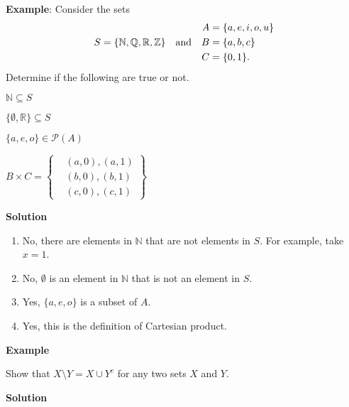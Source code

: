 \documentclass{article}
\begin{document}
    \textbf{Example}: Consider the sets $$S = \{\mathbb{N}, \mathbb{Q}, \mathbb{R}, \mathbb{Z}\}
    \text{\quad and\quad}
    \begin{aligned}
        A &= \{a, e, i, o, u\} \\
        B &= \{a, b, c\} \\
        C &= \{0, 1\}.
    \end{aligned}$$
    Determine if the following are true or not.
    \begin{enumerate}
    \begin{multicols}{2}
        \item $\mathbb{N} \subseteq S$
        \item $\{\emptyset, \mathbb{R}\} \subseteq S$
        \item $\{a, e, o\} \in \mathcal{P}(A)$
        \item 
        $B \times C = 
        \left\{\begin{aligned}
            & (a, 0), (a, 1) \\
            & (b, 0), (b, 1) \\
            & (c, 0), (c, 1)
        \end{aligned}\right\}$
                
    \end{multicols}
    \end{enumerate}
    
    \vspace{1.5mm}
    \textbf{Solution}
    \begin{enumerate}
        \item No, there are elements in $\mathbb{N}$ that are not elements in $S$. For example, take $x = 1$.
        \item No, $\emptyset$ is an element in $\mathbb{N}$ that is not an element in $S$.
        \item Yes, $\{a, e, o\}$ is a subset of $A$.
        \item Yes, this is the definition of Cartesian product.
    \end{enumerate}

    \vspace{1.5mm}
    \textbf{Example}
    
    \vspace{1.5mm}
    Show that $X \setminus Y = X \cup Y^{c}$ for any two sets $X$ and $Y$.
    
    \vspace{1.5mm}
    \textbf{Solution}
    
\end{document}
